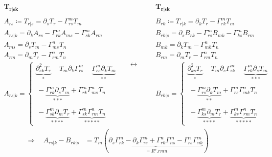 \begin{equation}
  \begin{split}
  \ & \boldsymbol{T_{r|sk}}\\\\
  \ & A_{rs} \coloneqq T_{r|s} = \partial_{s}T_r - \Gamma^m_{rs}T_m\\
  \ & A_{rs|k}= \partial_k A_{rs} - \Gamma^m_{rk}A_{ms} -  \Gamma^m_{sk}A_{rm}\\
  \ & A_{ms}=  \partial_{s}T_m - \Gamma^n_{ms}T_n\\
  \ & A_{rm} = \partial_{m}T_r - \Gamma^n_{rm}T_n\\
  \ & A_{rs|k}= \left \{\begin{array}{l}
   \underbrace{\partial^2_{sk}T_r}_{*} - T_m\partial_{k}\Gamma^m_{rs} - \underbrace{\Gamma^m_{rs}\partial_{k}T_m}_{**} \\\\
   \ -\underbrace{\Gamma^m_{rk}\partial_{s}T_m}_{***} +\Gamma^m_{rk} \Gamma^n_{ms}T_n \\\\
   \ - \underbrace{\Gamma^m_{sk}\partial_{m}T_r}_{****} +\underbrace{\Gamma^m_{sk} \Gamma^n_{rm}T_n}_{*****}
  \end{array}\right.
  \end{split}
\quad\leftrightarrow\quad
  \begin{split}
 \ & \boldsymbol{T_{r|sk}}\\\\
  \ & B_{rk} \coloneqq T_{r|k} = \partial_{k}T_r - \Gamma^m_{rk}T_m\\
  \ & B_{rk|s}= \partial_s B_{rk} - \Gamma^m_{rs}B_{mk} -  \Gamma^m_{ks}B_{rm}\\
  \ & B_{mk}=  \partial_{k}T_m - \Gamma^n_{mk}T_n\\
  \ & B_{rm}=  \partial_{m}T_r - \Gamma^n_{rm}T_n\\
  \ & B_{rk|s}= \left \{\begin{array}{l}
  \underbrace{\partial^2_{ks}T_r}_{*} - T_m\partial_{s}\Gamma^m_{rk} - \underbrace{\Gamma^m_{rk}\partial_{s}T_m}_{***} \\\\
   \ -\underbrace{\Gamma^m_{rs}\partial_{k}T_m}_{**} +\Gamma^m_{rs} \Gamma^n_{mk}T_n \\\\
   \ - \underbrace{\Gamma^m_{ks}\partial_{m}T_r}_{****} +\underbrace{\Gamma^m_{ks} \Gamma^n_{rm}T_n}_{*****}
  \end{array}\right.
  \end{split}
\end{equation}\begin{align}
\Rightarrow\quad A_{rs|k} - B_{rk|s} &= T_m\left( \underbrace{\partial_{s}\Gamma^m_{rk}-\partial_{k}\Gamma^m_{rs}+\Gamma^n_{rk} \Gamma^m_{ns}- \Gamma^n_{rs} \Gamma^m_{nk} }_{\coloneqq R^s{.rmn}}\right) 
\end{align}
